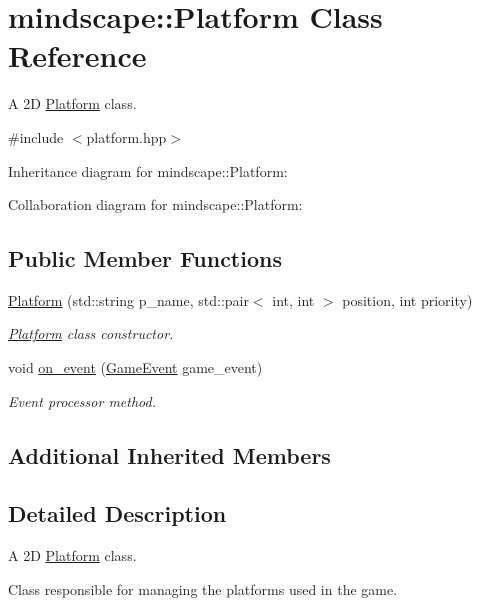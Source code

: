 \hypertarget{classmindscape_1_1_platform}{}\section{mindscape\+:\+:Platform Class Reference}
\label{classmindscape_1_1_platform}


A 2D \hyperlink{classmindscape_1_1_platform}{Platform} class.  




{\ttfamily \#include $<$platform.\+hpp$>$}



Inheritance diagram for mindscape\+:\+:Platform\+:


Collaboration diagram for mindscape\+:\+:Platform\+:
\subsection*{Public Member Functions}
\begin{DoxyCompactItemize}
\item 
\hyperlink{classmindscape_1_1_platform_aebeb96487bd3261d8c9c1046aa225630}{Platform} (std\+::string p\+\_\+name, std\+::pair$<$ int, int $>$ position, int priority)
\begin{DoxyCompactList}\small\item\em \hyperlink{classmindscape_1_1_platform}{Platform} class constructor. \end{DoxyCompactList}\item 
void \hyperlink{classmindscape_1_1_platform_a6216741f82664014836e0d8a44a6cf9b}{on\+\_\+event} (\hyperlink{class_game_event}{Game\+Event} game\+\_\+event)
\begin{DoxyCompactList}\small\item\em Event processor method. \end{DoxyCompactList}\end{DoxyCompactItemize}
\subsection*{Additional Inherited Members}


\subsection{Detailed Description}
A 2D \hyperlink{classmindscape_1_1_platform}{Platform} class. 

Class responsible for managing the platforms used in the game. 

